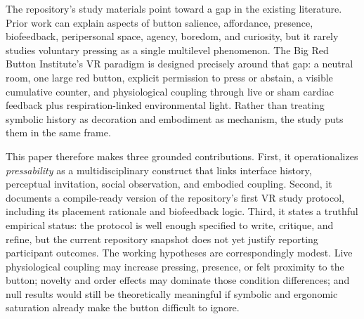 The repository's study materials point toward a gap in the existing literature. Prior work can explain aspects of button salience, affordance, presence, biofeedback, peripersonal space, agency, boredom, and curiosity, but it rarely studies voluntary pressing as a single multilevel phenomenon. The Big Red Button Institute's VR paradigm is designed precisely around that gap: a neutral room, one large red button, explicit permission to press or abstain, a visible cumulative counter, and physiological coupling through live or sham cardiac feedback plus respiration-linked environmental light. Rather than treating symbolic history as decoration and embodiment as mechanism, the study puts them in the same frame.

This paper therefore makes three grounded contributions. First, it operationalizes \emph{pressability} as a multidisciplinary construct that links interface history, perceptual invitation, social observation, and embodied coupling. Second, it documents a compile-ready version of the repository's first VR study protocol, including its placement rationale and biofeedback logic. Third, it states a truthful empirical status: the protocol is well enough specified to write, critique, and refine, but the current repository snapshot does not yet justify reporting participant outcomes. The working hypotheses are correspondingly modest. Live physiological coupling may increase pressing, presence, or felt proximity to the button; novelty and order effects may dominate those condition differences; and null results would still be theoretically meaningful if symbolic and ergonomic saturation already make the button difficult to ignore.
